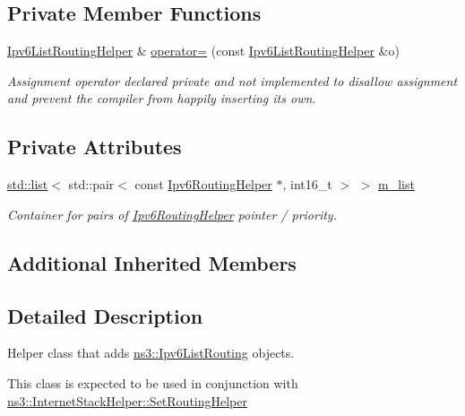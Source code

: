 \subsection*{Private Member Functions}
\begin{DoxyCompactItemize}
\item 
\hyperlink{classns3_1_1Ipv6ListRoutingHelper}{Ipv6\+List\+Routing\+Helper} \& \hyperlink{classns3_1_1Ipv6ListRoutingHelper_a5f230d5b586d86c87348c51e49c13fbb}{operator=} (const \hyperlink{classns3_1_1Ipv6ListRoutingHelper}{Ipv6\+List\+Routing\+Helper} \&o)
\begin{DoxyCompactList}\small\item\em Assignment operator declared private and not implemented to disallow assignment and prevent the compiler from happily inserting its own. \end{DoxyCompactList}\end{DoxyCompactItemize}
\subsection*{Private Attributes}
\begin{DoxyCompactItemize}
\item 
\hyperlink{openflow-interface_8h_afd9bcfa176617760671b67580f536fa7}{std\+::list}$<$ std\+::pair$<$ const \hyperlink{classns3_1_1Ipv6RoutingHelper}{Ipv6\+Routing\+Helper} $\ast$, int16\+\_\+t $>$ $>$ \hyperlink{classns3_1_1Ipv6ListRoutingHelper_aebbcb820adbd54879726bae01c18b8e3}{m\+\_\+list}
\begin{DoxyCompactList}\small\item\em Container for pairs of \hyperlink{classns3_1_1Ipv6RoutingHelper}{Ipv6\+Routing\+Helper} pointer / priority. \end{DoxyCompactList}\end{DoxyCompactItemize}
\subsection*{Additional Inherited Members}


\subsection{Detailed Description}
Helper class that adds \hyperlink{classns3_1_1Ipv6ListRouting}{ns3\+::\+Ipv6\+List\+Routing} objects. 

This class is expected to be used in conjunction with \hyperlink{classns3_1_1InternetStackHelper_a3e382c02df022dec79952a7eca8cd5ba}{ns3\+::\+Internet\+Stack\+Helper\+::\+Set\+Routing\+Helper} 

